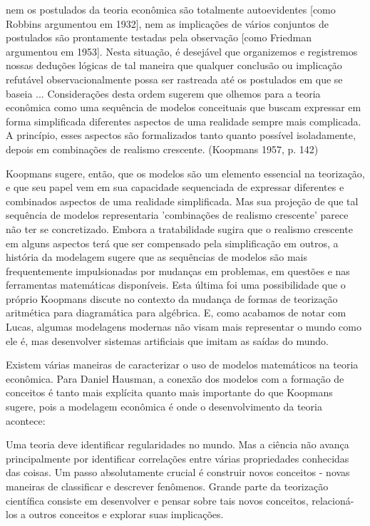 \documentclass[12pt]{article}
\begin{document}
nem os postulados da teoria econômica são totalmente autoevidentes [como Robbins argumentou em 1932], nem as implicações de vários conjuntos de postulados são prontamente testadas pela observação [como Friedman argumentou em 1953]. Nesta situação, é desejável que organizemos e registremos nossas deduções lógicas de tal maneira que qualquer conclusão ou implicação refutável observacionalmente possa ser rastreada até os postulados em que se baseia ... Considerações desta ordem sugerem que olhemos para a teoria econômica como uma sequência de modelos conceituais que buscam expressar em forma simplificada diferentes aspectos de uma realidade sempre mais complicada. A princípio, esses aspectos são formalizados tanto quanto possível isoladamente, depois em combinações de realismo crescente. (Koopmans 1957, p. 142)

Koopmans sugere, então, que os modelos são um elemento essencial na teorização, e que seu papel vem em sua capacidade sequenciada de expressar diferentes e combinados aspectos de uma realidade simplificada. Mas sua projeção de que tal sequência de modelos representaria 'combinações de realismo crescente' parece não ter se concretizado. Embora a tratabilidade sugira que o realismo crescente em alguns aspectos terá que ser compensado pela simplificação em outros, a história da modelagem sugere que as sequências de modelos são mais frequentemente impulsionadas por mudanças em problemas, em questões e nas ferramentas matemáticas disponíveis. Esta última foi uma possibilidade que o próprio Koopmans discute no contexto da mudança de formas de teorização aritmética para diagramática para algébrica. E, como acabamos de notar com Lucas, algumas modelagens modernas não visam mais representar o mundo como ele é, mas desenvolver sistemas artificiais que imitam as saídas do mundo.

Existem várias maneiras de caracterizar o uso de modelos matemáticos na teoria econômica. Para Daniel Hausman, a conexão dos modelos com a formação de conceitos é tanto mais explícita quanto mais importante do que Koopmans sugere, pois a modelagem econômica é onde o desenvolvimento da teoria acontece:

Uma teoria deve identificar regularidades no mundo. Mas a ciência não avança principalmente por identificar correlações entre várias propriedades conhecidas das coisas. Um passo absolutamente crucial é construir novos conceitos - novas maneiras de classificar e descrever fenômenos. Grande parte da teorização científica consiste em desenvolver e pensar sobre tais novos conceitos, relacioná-los a outros conceitos e explorar suas implicações.
\end{document}
